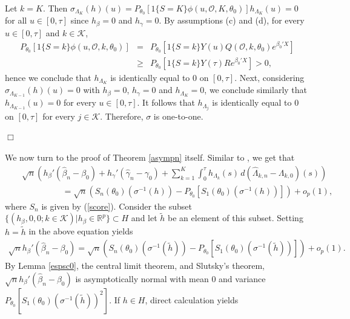 \documentclass{statsoc}
\begin{document}
\\
Let $k=K$. Then $\sigma_{\Lambda_K}(h)(u)=P_{\theta_0}\left[1\{S=K\}\phi(u,\mathcal O,K,\theta_0)\right]h_{\Lambda_K}(u)=0$ for all $u\in[0,\tau]$ since $h_\beta=0$ and $h_\gamma=0$. By assumptions (c) and (d), for every $u\in[0,\tau]$ and $k\in\mathcal K$,
\begin{eqnarray*}
P_{\theta_0}\left[1\{S=k\}\phi(u,\mathcal O,k,\theta_0)\right]&=&P_{\theta_0}\left[1\{S=k\}Y(u)Q(\mathcal O,k,\theta_0)e^{\beta_0'X}\right]\\
&\geq&P_{\theta_0}\left[1\{S=k\}Y(\tau)Re^{\beta_0'X}\right]>0,
\end{eqnarray*}
hence we conclude that $h_{\Lambda_K}$ is identically equal to 0 on $[0,\tau]$. Next, considering $\sigma_{\Lambda_{K-1}}(h)(u)=0$ with $h_\beta=0$, $h_\gamma=0$ and $h_{\Lambda_K}= 0$, we conclude similarly that $h_{\Lambda_{K-1}}(u)=0$ for every $u\in[0,\tau]$. It follows that $h_{\Lambda_j}$ is identically equal to 0 on $[0,\tau]$ for every $j\in\mathcal K$. Therefore, $\sigma$ is one-to-one.
\\
\\
$\Box$
\\
\\
We now turn to the proof of Theorem \ref{asympn} itself. Similar to \cite{fang05}, we get that
\begin{eqnarray*}
&&\sqrt n\left(h_\beta'(\widehat\beta_n-\beta_0)+h_\gamma'(\widehat\gamma_n-\gamma_0)+\sum_{k=1}^K\int_0^\tau h_{\Lambda_k}(s)\,d(\widehat\Lambda_{k,n}-\Lambda_{k,0})(s)\right)\\
&&\hspace{2cm}=\sqrt n\left(S_n(\theta_0)(\sigma^{-1}(h))- P_{\theta_0} \left[ S_1(\theta_0) (\sigma^{-1}(h)) \right] \right)+o_p(1),
\end{eqnarray*}
where $S_n$ is given by (\ref{score}). Consider the subset $\{(h_\beta,0,0; k\in\mathcal K)|h_\beta\in{\ensuremath{\mathbb{R}}}^p\}\subset H$ and let $\widetilde h$ be an element of this subset. Setting $h=\widetilde h$ in the above equation yields
\begin{eqnarray}\label{eqbeta}
\sqrt nh_\beta'(\widehat\beta_n-\beta_0)=\sqrt n\left(S_n(\theta_0)(\sigma^{-1}(\widetilde h))- P_{\theta_0} \left[ S_1(\theta_0) (\sigma^{-1}(\widetilde h)) \right] \right)+o_p(1).
\end{eqnarray}
By Lemma \ref{espsc0}, the central limit theorem, and Slutsky's theorem, $\sqrt nh_\beta'(\widehat\beta_n-\beta_0)$ is asymptotically normal with mean 0 and variance $P_{\theta_0}[ S_1(\theta_0) (\sigma^{-1}(\widetilde h))^2]$. If $h\in H$, direct calculation yields
\end{document}
